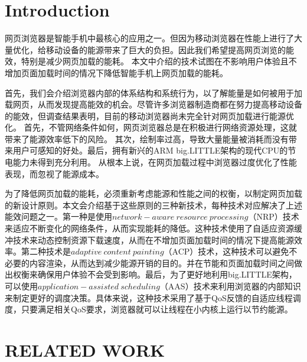 \documentclass{sig-alternate-05-2015}
\begin{document}
%
%

%
%
\printccsdesc



\section{Introduction}
网页浏览器是智能手机中最核心的应用之一。但因为移动浏览器在性能上进行了大量优化，给移动设备的能源带来了巨大的负担。因此我们希望提高网页浏览的能效，特别是减少网页加载的能耗。 本文中介绍的技术试图在不影响用户体验且不增加页面加载时间的情况下降低智能手机上网页加载的能耗。

首先，我们会介绍浏览器内部的体系结构和系统行为，以了解能量是如何被用于加载网页，从而发现提高能效的机会。尽管许多浏览器制造商都在努力提高移动设备的能效，但调查结果表明，目前的移动浏览器尚未完全针对网页加载进行能源优化。 首先，不管网络条件如何，网页浏览器总是在积极进行网络资源处理，这就带来了能源效率低下的风险。 其次，绘制率过高，导致大量能量被消耗而没有带来用户可感知的好处。最后，拥有新兴的ARM big.LITTLE架构\cite{2}的现代CPU的节电能力未得到充分利用。 从根本上说，在网页加载过程中浏览器过度优化了性能表现，而忽视了能源成本。

为了降低网页加载的能耗，必须重新考虑能源和性能之间的权衡，以制定网页加载的新设计原则。本文会介绍基于这些原则的三种新技术，每种技术对应解决了上述能效问题之一。第一种是使用$network-aware\ resource\ processing$（NRP）\cite{1}技术来适应不断变化的网络条件，从而实现能耗的降低。这种技术使用了自适应资源缓冲技术来动态控制资源下载速度，从而在不增加页面加载时间的情况下提高能源效率。第二种技术是$adaptive\ content\ painting$（ACP）\cite{1}技术，这种技术可以避免不必要的内容渲染，从而达到减少能源开销的目的。并在节能和页面加载时间之间做出权衡来确保用户体验不会受到影响。最后，为了更好地利用big.LITTLE架构，可以使用$application-assisted\ scheduling$（AAS）\cite{1}技术来利用浏览器的内部知识来制定更好的调度决策。具体来说，这种技术采用了基于QoS反馈的自适应线程调度，只要满足相关QoS要求，浏览器就可以让线程在小内核上运行以节约能源。


\section{RELATED WORK}
\end{document}
